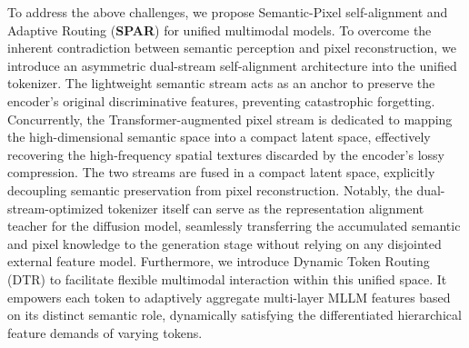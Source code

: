 \documentclass[runningheads]{llncs}
\newcommand{\lc}[1]{{\color{blue}{$^\textbf{\emph{Long:}}$[#1]}}}
\begin{document}

To address the above challenges, we propose Semantic-Pixel self-alignment and Adaptive Routing (\textbf{SPAR}) for unified multimodal models. 
To overcome the inherent contradiction between semantic perception and pixel reconstruction, we introduce an asymmetric dual-stream self-alignment architecture into the unified tokenizer. 
The lightweight semantic stream acts as an anchor to preserve the encoder's original discriminative features, preventing catastrophic forgetting. Concurrently, the Transformer-augmented pixel stream is dedicated to mapping the high-dimensional semantic space into a compact latent space, effectively recovering the high-frequency spatial textures discarded by the encoder's lossy compression.
The two streams are fused in a compact latent space, explicitly decoupling semantic preservation from pixel reconstruction. 
Notably, the dual-stream-optimized tokenizer itself can serve as the representation alignment teacher for the diffusion model, seamlessly transferring the accumulated semantic and pixel knowledge to the generation stage without relying on any disjointed external feature model. 
Furthermore, we introduce Dynamic Token Routing (DTR) to facilitate flexible multimodal interaction within this unified space. It empowers each token to adaptively aggregate multi-layer MLLM features based on its distinct semantic role, dynamically satisfying the differentiated hierarchical feature demands of varying tokens.
\end{document}
